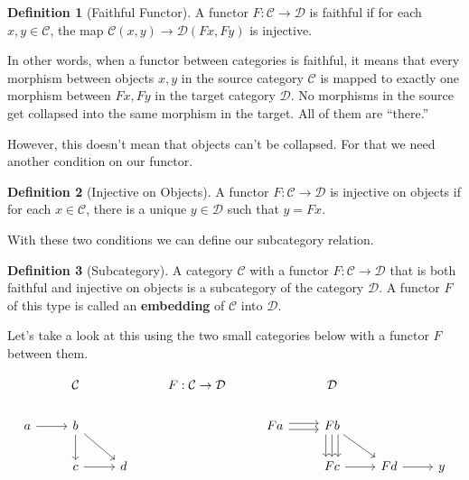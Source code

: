 \documentclass[12pt]{article}
\theoremstyle{definition}
\newtheorem{definition}{Definition}
\begin{document}
\begin{definition}[Faithful Functor]
    A functor $F:\mathcal{C}\rightarrow\mathcal{D}$ is faithful if for each $x,y\in\mathcal{C}$, the map $\mathcal{C}(x, y)\rightarrow\mathcal{D}(Fx,Fy)$ is injective.
\end{definition}
In other words, when a functor between categories is faithful, it means that every morphism between objects $x,y$ in the source category $\mathcal{C}$ is mapped to exactly one morphism between $Fx, Fy$ in the target category $\mathcal{D}$.
No morphisms in the source get collapsed into the same morphism in the target.
All of them are ``there.''

However, this doesn't mean that objects can't be collapsed.
For that we need another condition on our functor.

\begin{definition}[Injective on Objects]
    A functor $F:\mathcal{C}\rightarrow\mathcal{D}$ is injective on objects if for each $x\in\mathcal{C}$, there is a unique $y\in\mathcal{D}$ such that $y=Fx$.
\end{definition}

With these two conditions we can define our subcategory relation.

\begin{definition}[Subcategory]
    A category $\mathcal{C}$ with a functor $F:\mathcal{C}\rightarrow\mathcal{D}$ that is both faithful and injective on objects is a subcategory of the category $\mathcal{D}$.
    A functor $F$ of this type is called an \textbf{embedding} of $\mathcal{C}$ into $\mathcal{D}$.
\end{definition}

Let's take a look at this using the two small categories below with a functor $F$ between them.

\[\begin{tikzcd}
        & {\mathcal{C}} && {F:\mathcal{C}\rightarrow\mathcal{D}} && {\mathcal{D}} \\
        a & b &&& Fa & Fb \\
        & c & d &&& Fc & Fd & y
        \arrow[from=2-1, to=2-2]
        \arrow[from=2-2, to=3-2]
        \arrow[from=3-2, to=3-3]
        \arrow[from=2-2, to=3-3]
        \arrow[shift left, from=2-5, to=2-6]
        \arrow[shift left=2, from=2-6, to=3-6]
        \arrow[from=2-6, to=3-7]
        \arrow[from=3-6, to=3-7]
        \arrow[shift right, from=2-5, to=2-6]
        \arrow[shift right=2, from=2-6, to=3-6]
        \arrow[from=2-6, to=3-6]
        \arrow[from=3-7, to=3-8]
    \end{tikzcd}\]
\end{document}

